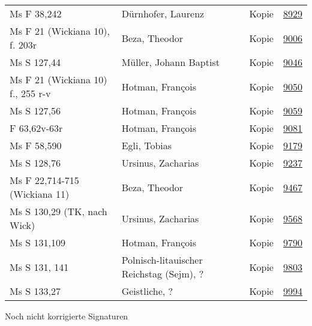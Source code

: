 \documentclass[10pt,a4paper,landscape]{report}
\begin{document}
\begin{longtable}{p{16cm}p{4cm}lr}
Ms F 38,242	&	Dürnhofer, Laurenz	&	Kopie	&	\href{http://130.60.24.72/assignment/8929}{8929}\\
Ms F 21 (Wickiana 10), f. 203r	&	Beza, Theodor	&	Kopie	&	\href{http://130.60.24.72/assignment/9006}{9006}\\
Ms S 127,44	&	Müller, Johann Baptist	&	Kopie	&	\href{http://130.60.24.72/assignment/9046}{9046}\\
Ms F 21 (Wickiana 10) f., 255 r-v	&	Hotman, François	&	Kopie	&	\href{http://130.60.24.72/assignment/9050}{9050}\\
Ms S 127,56	&	Hotman, François	&	Kopie	&	\href{http://130.60.24.72/assignment/9059}{9059}\\
F 63,62v-63r	&	Hotman, François	&	Kopie	&	\href{http://130.60.24.72/assignment/9081}{9081}\\
Ms F 58,590	&	Egli, Tobias	&	Kopie	&	\href{http://130.60.24.72/assignment/9179}{9179}\\
Ms S 128,76	&	Ursinus, Zacharias	&	Kopie	&	\href{http://130.60.24.72/assignment/9237}{9237}\\
Ms F 22,714-715 (Wickiana 11)	&	Beza, Theodor	&	Kopie	&	\href{http://130.60.24.72/assignment/9467}{9467}\\
Ms S 130,29 (TK, nach Wick)	&	Ursinus, Zacharias	&	Kopie	&	\href{http://130.60.24.72/assignment/9568}{9568}\\
Ms S 131,109	&	Hotman, François	&	Kopie	&	\href{http://130.60.24.72/assignment/9790}{9790}\\
Ms S 131, 141	&	Polnisch-litauischer Reichstag (Sejm), ?	&	Kopie	&	\href{http://130.60.24.72/assignment/9803}{9803}\\
Ms S 133,27	&	Geistliche, ?	&	Kopie	&	\href{http://130.60.24.72/assignment/9994}{9994}\\
\bottomrule
\end{longtable}





\newpage
\hypertarget{link:uncorr}{Noch nicht korrigierte Signaturen}
\end{document}
